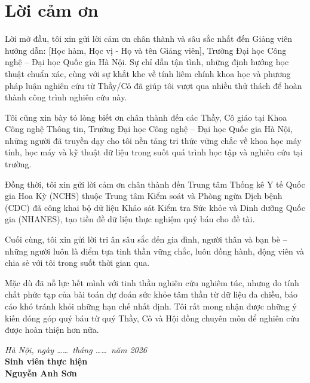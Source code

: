 \chapter*{Lời cảm ơn}

Lời mở đầu, tôi xin gửi lời cảm ơn chân thành và sâu sắc nhất đến Giảng viên hướng dẫn: [Học hàm, Học vị - Họ và tên Giảng viên], Trường Đại học Công nghệ -- Đại học Quốc gia Hà Nội. Sự chỉ dẫn tận tình, những định hướng học thuật chuẩn xác, cùng với sự khắt khe về tính liêm chính khoa học và phương pháp luận nghiên cứu từ Thầy/Cô đã giúp tôi vượt qua nhiều thử thách để hoàn thành công trình nghiên cứu này.

Tôi cũng xin bày tỏ lòng biết ơn chân thành đến các Thầy, Cô giáo tại Khoa Công nghệ Thông tin, Trường Đại học Công nghệ -- Đại học Quốc gia Hà Nội, những người đã truyền dạy cho tôi nền tảng tri thức vững chắc về khoa học máy tính, học máy và kỹ thuật dữ liệu trong suốt quá trình học tập và nghiên cứu tại trường.

Đồng thời, tôi xin gửi lời cảm ơn chân thành đến Trung tâm Thống kê Y tế Quốc gia Hoa Kỳ (NCHS) thuộc Trung tâm Kiểm soát và Phòng ngừa Dịch bệnh (CDC) đã công khai bộ dữ liệu Khảo sát Kiểm tra Sức khỏe và Dinh dưỡng Quốc gia (NHANES), tạo tiền đề dữ liệu thực nghiệm quý báu cho đề tài.

Cuối cùng, tôi xin gửi lời tri ân sâu sắc đến gia đình, người thân và bạn bè -- những người luôn là điểm tựa tinh thần vững chắc, luôn đồng hành, động viên và chia sẻ với tôi trong suốt thời gian qua.

Mặc dù đã nỗ lực hết mình với tinh thần nghiên cứu nghiêm túc, nhưng do tính chất phức tạp của bài toán dự đoán sức khỏe tâm thần từ dữ liệu đa chiều, báo cáo khó tránh khỏi những hạn chế nhất định. Tôi rất mong nhận được những ý kiến đóng góp quý báu từ quý Thầy, Cô và Hội đồng chuyên môn để nghiên cứu được hoàn thiện hơn nữa.

\vspace{1.5cm}
\begin{flushright}
\textit{Hà Nội, ngày \dots\dots\ tháng \dots\dots\ năm 2026}\\[0.2cm]
\textbf{Sinh viên thực hiện}\\[1.5cm]
\textbf{Nguyễn Anh Sơn}
\end{flushright}
\cleardoublepage


